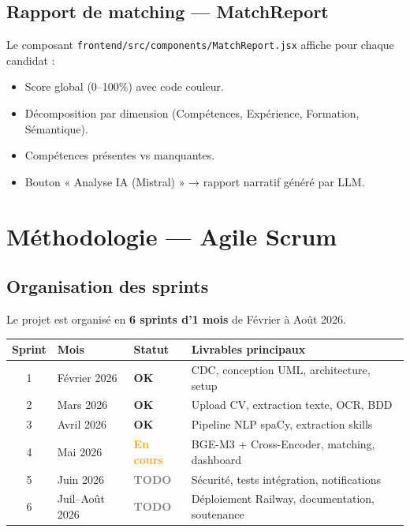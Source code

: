 \documentclass[12pt,a4paper]{report}
\newcommand{\filepath}[1]{\texttt{\small\textcolor{codeblue}{#1}}}
\begin{document}
\section{Rapport de matching — MatchReport}

Le composant \filepath{frontend/src/components/MatchReport.jsx} affiche pour chaque
candidat :
\begin{itemize}
  \item Score global (0–100\%) avec code couleur.
  \item Décomposition par dimension (Compétences, Expérience, Formation, Sémantique).
  \item Compétences présentes vs manquantes.
  \item Bouton « Analyse IA (Mistral) » → rapport narratif généré par LLM.
\end{itemize}

\chapter{Méthodologie — Agile Scrum}

\section{Organisation des sprints}

Le projet est organisé en \textbf{6 sprints d'1 mois} de Février à Août 2026.

\begin{center}
\begin{tabularx}{\textwidth}{cllX}
\toprule
\textbf{Sprint} & \textbf{Mois} & \textbf{Statut} & \textbf{Livrables principaux} \\
\midrule
1 & Février 2026 & \textcolor{codegreen}{\textbf{OK}} & CDC, conception UML, architecture, setup \\
2 & Mars 2026    & \textcolor{codegreen}{\textbf{OK}} & Upload CV, extraction texte, OCR, BDD \\
3 & Avril 2026   & \textcolor{codegreen}{\textbf{OK}} & Pipeline NLP spaCy, extraction skills \\
4 & Mai 2026     & \textcolor{orange}{\textbf{En cours}} & BGE-M3 + Cross-Encoder, matching, dashboard \\
5 & Juin 2026    & \textcolor{gray}{\textbf{TODO}} & Sécurité, tests intégration, notifications \\
6 & Juil–Août 2026 & \textcolor{gray}{\textbf{TODO}} & Déploiement Railway, documentation, soutenance \\
\bottomrule
\end{tabularx}
\end{center}
\end{document}
